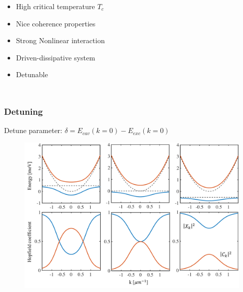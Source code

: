 \documentclass[9pt]{beamer}
\begin{document}
\begin{frame}[t]
\begin{columns}
\begin{itemize}
\item<4-> High critical temperature $T_{c}$
\item<5-> Nice coherence properties
\item<6-> Strong Nonlinear interaction
\item<7-> Driven-dissipative system
\item <8-> Detunable
\end{itemize}

\end{columns}
\end{frame}

\begin{frame}
\frametitle{Detuning}
\begin{center}
Detune parameter: $\delta = E_{cav}\left(k=0\right)-E_{exc}\left(k=0\right)$
\end{center}
\begin{figure}
\includegraphics[width=.95\textwidth]{./fig/hp_disp.pdf}
\end{figure}
\end{frame}
\end{document}
